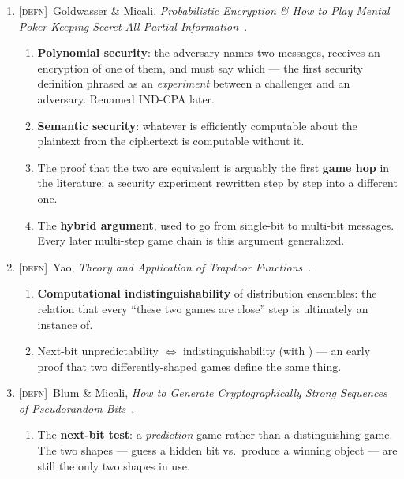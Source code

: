\documentclass[11pt]{article}
\newcommand{\kind}[1]{{\footnotesize\textsc{\textcolor{yearcolor}{[#1]}}}\ }
\newcommand{\defn}{\kind{defn}}
\newcommand{\paper}[3]{#1, \emph{#2}~\cite{#3}.}
\begin{document}
\begin{enumerate}
  \item \defn \paper{Goldwasser \& Micali}{Probabilistic Encryption \& How to
    Play Mental Poker Keeping Secret All Partial Information}{GM82,GM84}
    \begin{enumerate}
      \item \textbf{Polynomial security}: the adversary names two messages,
        receives an encryption of one of them, and must say which --- the first
        security definition phrased as an \emph{experiment} between a
        challenger and an adversary. Renamed IND-CPA later.
      \item \textbf{Semantic security}: whatever is efficiently computable
        about the plaintext from the ciphertext is computable without it.
      \item The proof that the two are equivalent is arguably the first
        \textbf{game hop} in the literature: a security experiment rewritten
        step by step into a different one.
      \item The \textbf{hybrid argument}, used to go from single-bit to
        multi-bit messages. Every later multi-step game chain is this argument
        generalized.
    \end{enumerate}

  \item \defn \paper{Yao}{Theory and Application of Trapdoor Functions}{Yao82}
    \begin{enumerate}
      \item \textbf{Computational indistinguishability} of distribution
        ensembles: the relation that every ``these two games are close'' step
        is ultimately an instance of.
      \item Next-bit unpredictability $\Longleftrightarrow$ indistinguishability
        (with \cite{BM84}) --- an early proof that two differently-shaped games
        define the same thing.
    \end{enumerate}

  \item \defn \paper{Blum \& Micali}{How to Generate Cryptographically Strong
    Sequences of Pseudorandom Bits}{BM84}
    \begin{enumerate}
      \item The \textbf{next-bit test}: a \emph{prediction} game rather than a
        distinguishing game. The two shapes --- guess a hidden bit vs.\ produce
        a winning object --- are still the only two shapes in use.
    \end{enumerate}
\end{enumerate}
\end{document}
